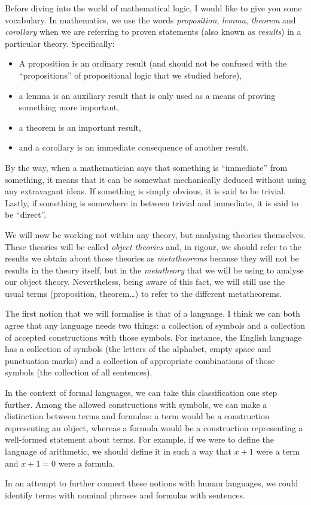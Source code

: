\begin{para}
Before diving into the world of mathematical logic, I would like to give you some vocabulary. In mathematics, we use the words \emph{proposition}, \emph{lemma}, \emph{theorem} and \emph{corollary} when we are referring to proven statements (also known as \emph{results}) in a particular theory. Specifically:
\begin{itemize}
\item A proposition is an ordinary result (and should not be confused with the ``propositions'' of propositional logic that we studied before),
\item a lemma is an auxiliary result that is only used as a means of proving something more important,
\item a theorem is an important result,
\item and a corollary is an immediate consequence of another result.
\end{itemize}

By the way, when a mathematician says that something is ``immediate'' from something, it means that it can be somewhat mechanically deduced without using any extravagant ideas.
If something is simply obvious, it is said to be trivial.
Lastly, if something is somewhere in between trivial and immediate, it is said to be ``direct''.

We will now be working not within any theory, but analysing theories themselves. These theories will be called \emph{object theories} and, in rigour, we should refer to the results we obtain about those theories as \emph{metatheorems} because they will not be results in the theory itself, but in the \emph{metatheory} that we will be using to analyse our object theory. Nevertheless, being aware of this fact, we will still use the usual terms (proposition, theorem\ldots) to refer to the different metatheorems.
\end{para}

\begin{para}
The first notion that we will formalise is that of a language.
I think we can both agree that any language needs two things: a collection of symbols and a collection of accepted constructions with those symbols.
For instance, the English language has a collection of symbols (the letters of the alphabet, empty space and punctuation marks) and a collection of appropriate combinations of those symbols (the collection of all sentences).

In the context of formal languages, we can take this classification one step further.
Among the allowed constructions with symbols, we can make a distinction between terms and formulas: a term would be a construction representing an object, whereas a formula would be a construction representing a well-formed statement about terms.
For example, if we were to define the language of arithmetic, we should define it in such a way that $x+1$ were a term and $x+1 = 0$ were a formula.

In an attempt to further connect these notions with human languages, we could identify terms with nominal phrases and formulas with sentences.
\end{para}

